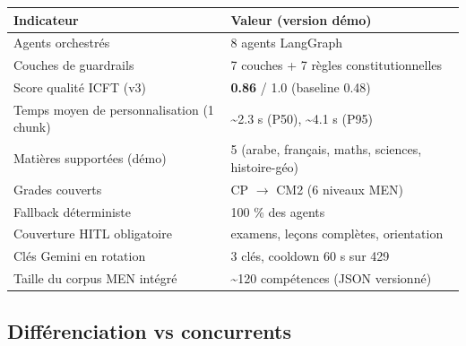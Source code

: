 \documentclass[11pt,a4paper]{article}
\begin{document}
\begin{center}
\small
\begin{tabular}{@{}p{6.5cm}p{8.3cm}@{}}
\toprule
\textbf{Indicateur} & \textbf{Valeur (version démo)} \\
\midrule
Agents orchestrés                         & 8 agents LangGraph \\
Couches de guardrails                     & 7 couches + 7 règles constitutionnelles \\
Score qualité ICFT (v3)                   & \textbf{0.86} / 1.0 (baseline 0.48) \\
Temps moyen de personnalisation (1 chunk) & \textasciitilde 2.3 s (P50), \textasciitilde 4.1 s (P95) \\
Matières supportées (démo)                & 5 (arabe, français, maths, sciences, histoire-géo) \\
Grades couverts                           & CP $\rightarrow$ CM2 (6 niveaux MEN) \\
Fallback déterministe                     & 100 \% des agents \\
Couverture HITL obligatoire               & examens, leçons complètes, orientation \\
Clés Gemini en rotation                   & 3 clés, cooldown 60 s sur 429 \\
Taille du corpus MEN intégré              & \textasciitilde 120 compétences (JSON versionné) \\
\bottomrule
\end{tabular}
\end{center}

\subsection{Différenciation vs concurrents}
\end{document}
